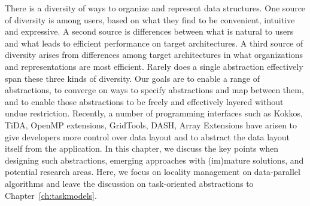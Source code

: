There is a diversity of ways to organize and represent data structures.  One source of diversity is among users, based on what they find to be convenient, intuitive and expressive.  A second source is differences between what is natural to users and what leads to efficient performance on target architectures.  A third source of diversity arises from differences among target architectures in what organizations and representations are most efficient.  Rarely does a single abstraction effectively span these three kinds of diversity.  Our goals are to enable a range of abstractions, to converge on ways to specify abstractions and map between them, and to enable those abstractions to be freely and effectively layered without undue restriction. Recently, a number of programming interfaces such as Kokkos, TiDA, OpenMP extensions, GridTools, DASH, Array Extensions \cite{all} have arisen to give developers more control over 
 data layout and to abstract the data layout itself from the application. 
 In this chapter, we discuss the key points when designing such abstractions, emerging approaches with (im)mature
 solutions, and potential research areas. Here, we focus on  locality management on data-parallel algorithms 
 and leave the discussion on task-oriented abstractions to Chapter~\ref{ch:taskmodels}.



